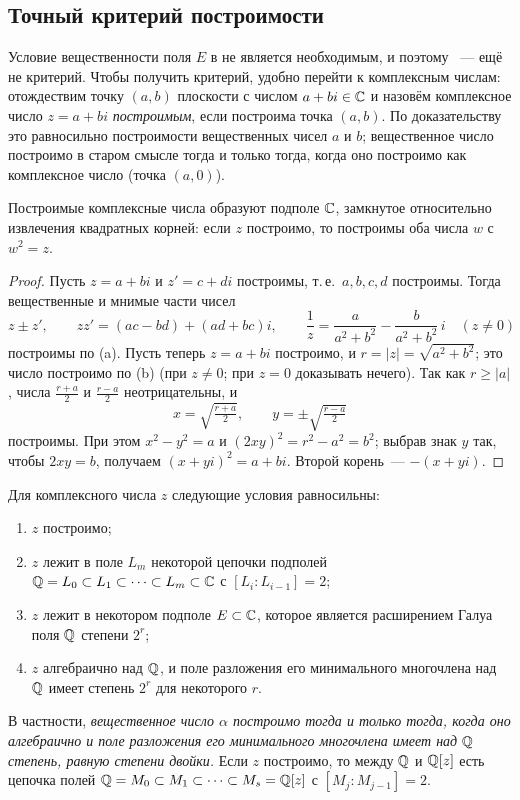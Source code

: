 \subsection*{Точный критерий построимости}

Условие вещественности поля $E$ в  не является необходимым, и поэтому ~--- ещё не критерий.
Чтобы получить критерий, удобно перейти к комплексным числам: отождествим точку $(a,b)$ плоскости с числом $a+bi\in\mathbb C$
и назовём комплексное число $z=a+bi$ \emph{построимым}, если построима точка $(a,b)$. По доказательству  это
равносильно построимости вещественных чисел $a$ и $b$; вещественное число построимо в старом смысле тогда и только
тогда, когда оно построимо как комплексное число (точка $(a,0)$).

\begin{lemma}[3.25a]
Построимые комплексные числа образуют подполе $\mathbb C$, замкнутое относительно извлечения квадратных корней: если $z$
построимо, то построимы оба числа $w$ с $w^2=z$.
\end{lemma}

\begin{proof}
Пусть $z=a+bi$ и $z'=c+di$ построимы, т.\,е.\ $a,b,c,d$ построимы. Тогда вещественные и мнимые части чисел
\[
z\pm z',\qquad zz'=(ac-bd)+(ad+bc)i,\qquad \frac1z=\frac{a}{a^2+b^2}-\frac{b}{a^2+b^2}\,i\quad(z\ne0)
\]
построимы по (a). Пусть теперь $z=a+bi$ построимо, и $r=|z|=\sqrt{a^2+b^2}$; это число построимо по
(b) (при $z\ne0$; при $z=0$ доказывать нечего). Так как $r\ge|a|$, числа $\frac{r+a}2$ и $\frac{r-a}2$
неотрицательны, и
\[
x=\sqrt{\tfrac{r+a}2},\qquad y=\pm\sqrt{\tfrac{r-a}2}
\]
построимы. При этом $x^2-y^2=a$ и $(2xy)^2=r^2-a^2=b^2$; выбрав знак $y$ так, чтобы $2xy=b$, получаем $(x+yi)^2=a+bi$.
Второй корень~--- $-(x+yi)$.
\end{proof}

\begin{theorem}
Для комплексного числа $z$ следующие условия равносильны:
\begin{enumerate}[label=\textup{(\alph*)}]
\item $z$ построимо;
\item $z$ лежит в поле $L_m$ некоторой цепочки подполей $\mathbb Q=L_0\subset L_1\subset\dots\subset L_m\subset\mathbb C$ с
$[L_i:L_{i-1}]=2$;
\item $z$ лежит в некотором подполе $E\subset\mathbb C$, которое является расширением Галуа поля $\mathbb Q$ степени $2^r$;
\item $z$ алгебраично над $\mathbb Q$, и поле разложения его минимального многочлена над $\mathbb Q$ имеет степень $2^r$ для
некоторого $r$.
\end{enumerate}
В частности, \emph{вещественное число $\alpha$ построимо тогда и только тогда, когда оно алгебраично и поле разложения
его минимального многочлена имеет над $\mathbb Q$ степень, равную степени двойки.} Если $z$ построимо, то между $\mathbb Q$ и
$\mathbb Q[z]$ есть цепочка полей $\mathbb Q=M_0\subset M_1\subset\dots\subset M_s=\mathbb Q[z]$ с $[M_j:M_{j-1}]=2$.
\end{theorem}

